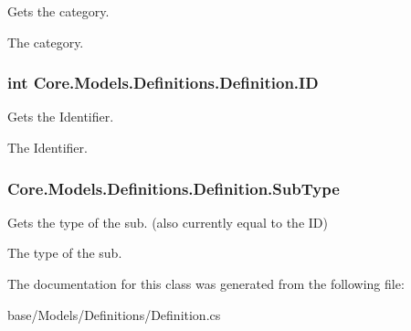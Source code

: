 Gets the category. 

The category.\hypertarget{classCore_1_1Models_1_1Definitions_1_1Definition_a6504fe4404e24c0b0601b0591f99fda4}{}
\subsubsection[{I\+D}]{\setlength{\rightskip}{0pt plus 5cm}int Core.\+Models.\+Definitions.\+Definition.\+I\+D\hspace{0.3cm}{\ttfamily [get]}}\label{classCore_1_1Models_1_1Definitions_1_1Definition_a6504fe4404e24c0b0601b0591f99fda4}


Gets the Identifier. 

The Identifier.\hypertarget{classCore_1_1Models_1_1Definitions_1_1Definition_ae71f596d97485f31733d1b9b5144051a}{}
\subsubsection[{Sub\+Type}]{ Core.\+Models.\+Definitions.\+Definition.\+Sub\+Type\hspace{0.3cm}{\ttfamily [get]}}\label{classCore_1_1Models_1_1Definitions_1_1Definition_ae71f596d97485f31733d1b9b5144051a}


Gets the type of the sub. (also currently equal to the I\+D) 

The type of the sub.

The documentation for this class was generated from the following file\+:\begin{DoxyCompactItemize}
\item 
base/\+Models/\+Definitions/Definition.\+cs\end{DoxyCompactItemize}
